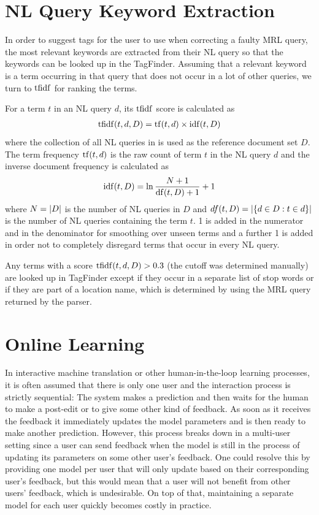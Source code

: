 
\section{NL Query Keyword Extraction}
\label{sec:keyword-extraction}

In order to suggest tags for the user to use when correcting a faulty MRL query,
the most relevant keywords are extracted from their NL query so that the
keywords can be looked up in the TagFinder. Assuming that a relevant keyword is
a term occurring in that query that does not occur in a lot of other queries, we
turn to \(\operatorname{tfidf}\) for ranking the terms.

For a term \(t\) in an NL query \(d\), its \(\operatorname{tfidf}\) score is calculated as
\begin{align}
  \operatorname{tfidf} (t, d, D) = \operatorname{tf}(t, d) \times \operatorname{idf}(t, D)
\end{align}
where the collection of all NL queries in \nlmapsthree{} is used as the
reference document set \(D\). The term frequency \(\operatorname{tf}(t, d)\) is the raw count
of term \(t\) in the NL query \(d\) and the inverse document frequency is
calculated as
\begin{align}
  \operatorname{idf}(t, D) = \ln \frac{N + 1}{\operatorname{df}(t, D) + 1} + 1
\end{align}
where \(N = \left|D\right|\) is the number of NL queries in \(D\) and \(df(t, D) =
\left|\left\{ d \in D : t \in d \right\}\right|\) is the number of NL queries
containing the term \(t\). \num{1} is added in the numerator and in the
denominator for smoothing over unseen terms and a further \num{1} is added in
order not to completely disregard terms that occur in every NL query.

Any terms with a score \(\operatorname{tfidf}(t, d, D) > 0.3\) (the cutoff was determined
manually) are looked up in TagFinder except if they occur in a separate list of
stop words or if they are part of a location name, which is determined by using
the MRL query returned by the parser.


\section{Online Learning}

In interactive machine translation or other human-in-the-loop learning
processes, it is often assumed that there is only one user and the interaction
process is strictly sequential: The system makes a prediction and then waits for
the human to make a post-edit or to give some other kind of feedback. As soon as
it receives the feedback it immediately updates the model parameters and is then
ready to make another prediction. However, this process breaks down in a
multi-user setting since a user can send feedback when the model is still in the
process of updating its parameters on some other user’s feedback. One could
resolve this by providing one model per user that will only update based on
their corresponding user’s feedback, but this would mean that a user will not
benefit from other users’ feedback, which is undesirable. On top of that,
maintaining a separate model for each user quickly becomes costly in practice.

